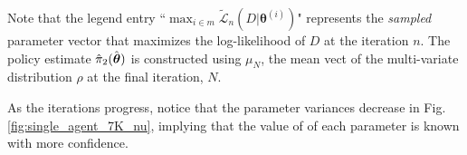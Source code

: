     Note that the legend entry ``$\max_{i \in m}\tilde{\mathcal{L}}_n(D|\mathbf{\theta}^{(i)})$" represents the
    \emph{sampled} parameter vector that maximizes the log-likelihood of $D$ at the iteration $n$. The policy estimate
    $\hat{\pi}_2(\hat{\boldsymbol{\mathbb{\theta}}})$ is constructed using $\mu_N$, the mean vect of the multi-variate
    distribution $\rho$ at the final iteration, $N$.

    As the iterations progress, notice that the parameter variances decrease in Fig. \ref{fig:single_agent_7K_nu},
    implying that the value of of each parameter is known with more confidence.

    \begin{figure}[H]
        \begin{center}
        \end{center}
    \end{figure}

    \begin{figure}[H]
        \begin{center}
        \end{center}
    \end{figure}


        \begin{figure}[H]
                \begin{center}
                \end{center}
        \end{figure}

